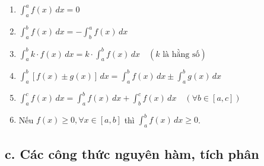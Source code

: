 \begin{enumerate}
    \item $\int_{a}^{a} f(x) \, dx = 0$
    \item $\int_{a}^{b} f(x) \, dx = -\int_{b}^{a} f(x) \, dx$
    \item $\int_{a}^{b} k \cdot f(x) \, dx = k \cdot \int_{a}^{b} f(x) \, dx \quad (k \text{ là hằng số})$
    \item $\int_{a}^{b} [f(x) \pm g(x)] \, dx = \int_{a}^{b} f(x) \, dx \pm \int_{a}^{b} g(x) \, dx$
    \item $\int_{a}^{c} f(x) \, dx = \int_{a}^{b} f(x) \, dx + \int_{b}^{c} f(x) \, dx \quad (\forall b \in [a, c])$
    \item Nếu $f(x) \ge 0, \forall x \in [a, b]$ thì $\int_{a}^{b} f(x) \, dx \ge 0$.
\end{enumerate}

\subsection*{c. Các công thức nguyên hàm, tích phân}

